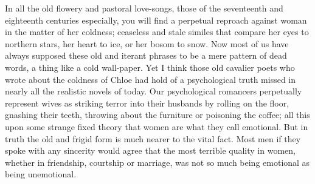 \documentclass{book}
\begin{document}
In all the old flowery and pastoral love-songs, those of the seventeenth and eighteenth centuries especially, you will find a perpetual reproach against woman in the matter of her coldness; ceaseless and stale similes that compare her eyes to northern stars, her heart to ice, or her bosom to snow. Now most of us have always supposed these old and iterant phrases to be a mere pattern of dead words, a thing like a cold wall-paper. Yet I think those old cavalier poets who wrote about the coldness of Chloe had hold of a psychological truth missed in nearly all the realistic novels of today. Our psychological romancers perpetually represent wives as striking terror into their husbands by rolling on the floor, gnashing their teeth, throwing about the furniture or poisoning the coffee; all this upon some strange fixed theory that women are what they call emotional. But in truth the old and frigid form is much nearer to the vital fact. Most men if they spoke with any sincerity would agree that the most terrible quality in women, whether in friendship, courtship or marriage, was not so much being emotional as being unemotional.
\end{document}
